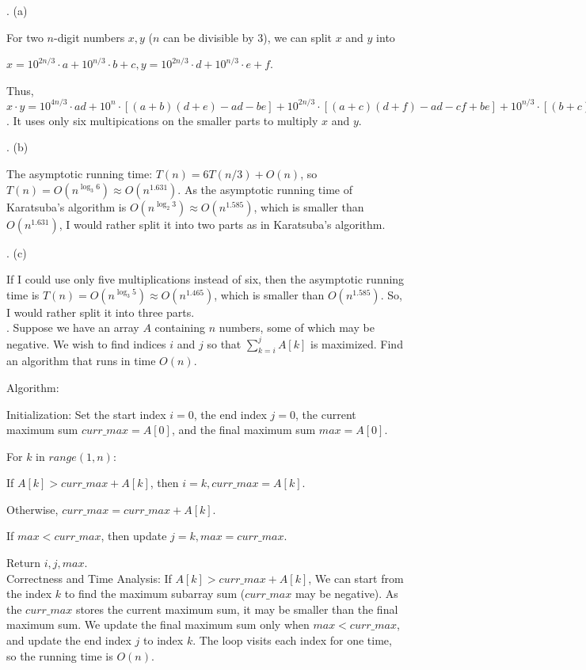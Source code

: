 \documentclass[11pt]{article} %
\begin{document}
. (a) 

For two $n$-digit numbers $x, y$ ($n$ can be divisible by 3), we can split $x$ and $y$ into

\noindent
$x = 10^{2n/3}\cdot a+10^{n/3}\cdot b+c, y = 10^{2n/3}\cdot d+10^{n/3}\cdot e+f$. 

\noindent
Thus, $x \cdot y =  10^{4n/3}\cdot ad + 10^n \cdot [(a+b)(d+e)-ad-be] +  10^{2n/3}\cdot [(a+c)(d+f)-ad-cf+be] +  10^{n/3}\cdot [(b+c)(e+f)-be-cf] + cf$. It uses only six multipications on the smaller parts to multiply $x$ and $y$.

. (b)

The asymptotic running time: $T(n) = 6T(n/3) + O(n)$, so $T(n) = O(n^{\log_3 6}) \approx O(n^{1.631})$. As the asymptotic running time of Karatsuba's algorithm is $ O(n^{\log_2 3}) \approx O(n^{1.585})$, which is smaller than $ O(n^{1.631})$, I would rather split it into two parts as in Karatsuba's algorithm.

. (c)

If I could use only five multiplications instead of six, then the asymptotic running time is $T(n) = O(n^{\log_3 5}) \approx O(n^{1.465})$, which is smaller than $O(n^{1.585})$. So, I would rather split it into three parts.\\


. Suppose we have an array $A$ containing $n$ numbers, some of which may be negative. We wish to find indices $i$ and $j$ so that $\sum_{k=i}^j A[k]$ is maximized. Find an algorithm that runs in time $O(n)$.

Algorithm:

Initialization: Set the start index $i=0$, the end index $j=0$, the current maximum sum $curr\_max = A[0]$, and the final maximum sum $max = A[0]$.

For $k$ in $range(1, n)$: 

\quad If $A[k]>curr\_max+A[k]$, then $i = k, curr\_max = A[k]$. 

\quad Otherwise, $curr\_max = curr\_max + A[k]$.

\quad If $max < curr\_max$, then update $j=k, max = curr\_max$. 

Return $i, j, max$.\\


Correctness and Time Analysis: If $A[k]>curr\_max+A[k]$, We can start from the index $k$ to find the maximum subarray sum ($curr\_max$ may be negative). As the $curr\_max$ stores the current maximum sum, it may be smaller than the final maximum sum. We update the final maximum sum only when  $max < curr\_max$, and update the end index $j$ to index $k$.
The loop visits each index for one time, so the running time is $O(n)$.\\
\end{document}
